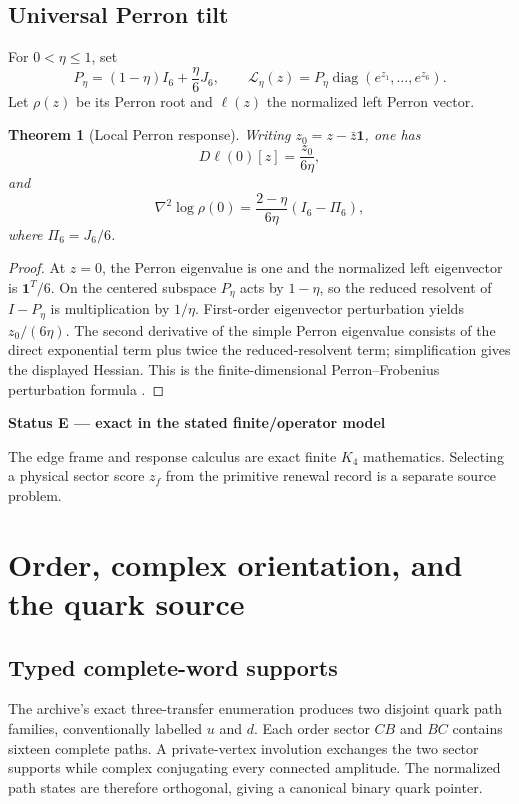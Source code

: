 \documentclass[11pt,oneside,openany]{book}
\numberwithin{equation}{chapter}
\newtheorem{theorem}{Theorem}[chapter]
\theoremstyle{definition}
\theoremstyle{remark}
\newcommand{\diag}{\operatorname{diag}}
\newenvironment{statusbox}[2]{%
  \par\medskip\noindent
  \begin{center}\begin{minipage}{0.94\textwidth}
  \colorbox{#1!8}{\parbox{\dimexpr\linewidth-2\fboxsep\relax}{\textbf{#2}}}\par\smallskip
}{%
  \end{minipage}\end{center}\medskip
}
\newcommand{\Exact}[1]{\begin{statusbox}{ExactColor}{Status E --- exact in the stated finite/operator model}#1\end{statusbox}}
\begin{document}
\section{Universal Perron tilt}
For $0<\eta\le1$, set
\[
 P_\eta=(1-\eta)I_6+\frac\eta6J_6,
 \qquad
 \mathcal L_\eta(z)=P_\eta\diag(e^{z_1},\ldots,e^{z_6}).
\]
Let $\rho(z)$ be its Perron root and $\ell(z)$ the normalized left Perron vector.

\begin{theorem}[Local Perron response]
\label{thm:perron-response}
Writing $z_0=z-\bar z\mathbf1$, one has
\[
 D\ell(0)[z]=\frac{z_0}{6\eta},
\]
and
\[
 \boxed{
 \nabla^2\log\rho(0)
 =\frac{2-\eta}{6\eta}(I_6-\Pi_6),
 }
\]
where $\Pi_6=J_6/6$.
\end{theorem}

\begin{proof}
At $z=0$, the Perron eigenvalue is one and the normalized left eigenvector is $\mathbf1^T/6$.  On the centered subspace $P_\eta$ acts by $1-\eta$, so the reduced resolvent of $I-P_\eta$ is multiplication by $1/\eta$.  First-order eigenvector perturbation yields $z_0/(6\eta)$.  The second derivative of the simple Perron eigenvalue consists of the direct exponential term plus twice the reduced-resolvent term; simplification gives the displayed Hessian.  This is the finite-dimensional Perron--Frobenius perturbation formula \cite{Seneta1981,Kato1995}.
\end{proof}

\Exact{The edge frame and response calculus are exact finite $K_4$ mathematics.  Selecting a physical sector score $z_f$ from the primitive renewal record is a separate source problem.}

\chapter{Order, complex orientation, and the quark source}
\label{ch:quark-source}

\section{Typed complete-word supports}
The archive's exact three-transfer enumeration produces two disjoint quark path families, conventionally labelled $u$ and $d$.  Each order sector $CB$ and $BC$ contains sixteen complete paths.  A private-vertex involution exchanges the two sector supports while complex conjugating every connected amplitude.  The normalized path states are therefore orthogonal, giving a canonical binary quark pointer.
\end{document}
